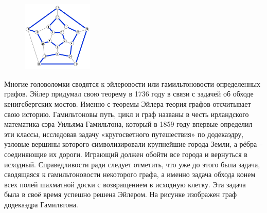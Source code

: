 \begin{figure}
\centering
\includegraphics[width=0.3\textwidth]{img/10.2 1 pyat.png}
\end{figure}

Многие головоломки сводятся к эйлеровости или гамильтоновости определенных графов. Эйлер придумал свою теорему в 1736 году в связи с задачей об обходе кенигсбергских мостов. Именно с теоремы Эйлера теория графов отсчитывает свою историю. Гамильтоновы путь, цикл и граф названы в честь ирландского математика сэра Уильяма Гамильтона, который в 1859 году впервые определил эти классы, исследовав задачу «кругосветного путешествия» по додекаэдру, узловые вершины которого символизировали крупнейшие города Земли, а рёбра – соединяющие их дороги. Играющий должен обойти все города и вернуться в исходный. Справедливости ради следует отметить, что уже до этого была задача, сводящаяся к гамильтоновости некоторого графа, а именно задача обхода конем всех полей шахматной доски с возвращением в исходную клетку. Эта задача была в своё время успешно решена Эйлером. На рисунке изображен граф додекаэдра Гамильтона.

